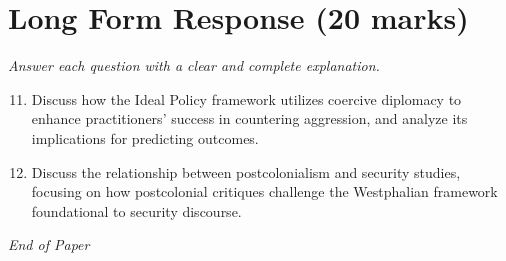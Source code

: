 \documentclass[12pt]{article}
\begin{document}
\section*{Long Form Response (20 marks)}
\textit{Answer each question with a clear and complete explanation.}
\begin{enumerate}[label=\arabic*.]
\setcounter{enumi}{10}
\item Discuss how the Ideal Policy framework utilizes coercive diplomacy to enhance practitioners' success in countering aggression, and analyze its implications for predicting outcomes.
\item Discuss the relationship between postcolonialism and security studies, focusing on how postcolonial critiques challenge the Westphalian framework foundational to security discourse.
\end{enumerate}

\vfill
\noindent\textit{End of Paper}
\end{document}

